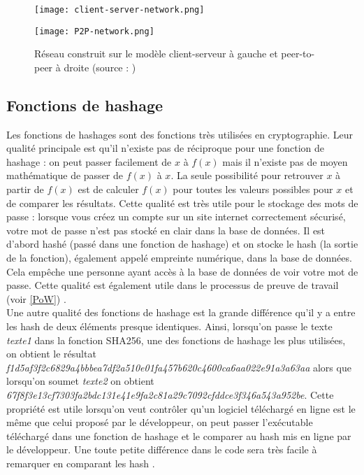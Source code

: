 \documentclass[10pt,a4paper,twoside]{article}
\numberwithin{equation}{section}
\begin{document}
		\begin{figure}[H] \label{network_models}
			\centering
			\begin{multicols}{2}
				\texttt{[image: client-server-network.png]}\par
				\texttt{[image: P2P-network.png]}\par
			\end{multicols}
			\caption{Réseau construit sur le modèle client-serveur à gauche et peer-to-peer à droite (source : \cite{wiki:p2p})}
		\end{figure}

	\subsection{Fonctions de hashage} \label{hash}
		Les fonctions de hashages sont des fonctions très utilisées en cryptographie. Leur qualité principale est qu'il n'existe pas de réciproque pour une fonction de hashage : on peut passer facilement de $x$ à $f(x)$ mais il n'existe pas de moyen mathématique de passer de $f(x)$ à $x$. La seule possibilité pour retrouver $x$ à partir de $f(x)$ est de calculer $f(x)$ pour toutes les valeurs possibles pour $x$ et de comparer les résultats. Cette qualité est très utile pour le stockage des mots de passe : lorsque vous créez un compte sur un site internet correctement sécurisé, votre mot de passe n'est pas stocké en clair dans la base de données. Il est d'abord hashé (passé dans une fonction de hashage) et on stocke le hash (la sortie de la fonction), également appelé empreinte numérique, dans la base de données. Cela empêche une personne ayant accès à la base de données de voir votre mot de passe. Cette qualité est également utile dans le processus de preuve de travail (voir \autoref{PoW}) \cite{fonctions_hashage} \cite{wiki:fonctions_hashage}.\\
		
		Une autre qualité des fonctions de hashage est la grande différence qu'il y a entre les hash de deux éléments presque identiques. Ainsi, lorsqu'on passe le texte \textit{texte1} dans la fonction SHA256, une des fonctions de hashage les plus utilisées, on obtient le résultat \textit{f1d5af3f2c6829a4bbbea7df2a510e01fa457b620c4600ca6aa022e91a3a63aa} alors que lorsqu'on soumet \textit{texte2} on obtient \textit{67f8f3e13cf7303fa2bdc131e41e9fa2c81a29c7092cfddce3f346a543a952be}. Cette propriété est utile lorsqu'on veut contrôler qu'un logiciel téléchargé en ligne est le même que celui proposé par le développeur, on peut passer l'exécutable téléchargé dans une fonction de hashage et le comparer au hash mis en ligne par le développeur. Une toute petite différence dans le code sera très facile à remarquer en comparant les hash\cite{fonctions_hashage} \cite{wiki:fonctions_hashage}.\\
		
\end{document}
